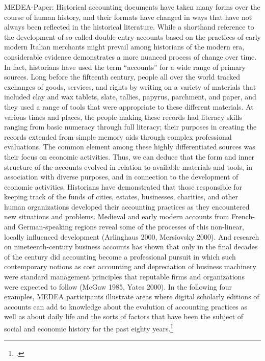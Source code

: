 \documentclass[12pt,a4paper]{article}
\begin{document}
MEDEA-Paper:
Historical accounting documents have taken many forms over the course of human history, and
their formats have changed in ways that have not always been reflected in the historical
literature. While a shorthand reference to the development of so-called double entry accounts
based on the practices of early modern Italian merchants might prevail among historians of the
modern era, considerable evidence demonstrates a more nuanced process of change over time. In
fact, historians have used the term “accounts” for a wide range of primary sources. Long before
the fifteenth century, people all over the world tracked exchanges of goods, services, and rights
by writing on a variety of materials that included clay and wax tablets, slate, tallies, papyrus,
parchment, and paper, and they used a range of tools that were appropriate to these different
materials. At various times and places, the people making these records had literacy skills
ranging from basic numeracy through full literacy; their purposes in creating the records
extended from simple memory aids through complex professional evaluations. The common
element among these highly differentiated sources was their focus on economic activities. Thus,
we can deduce that the form and inner structure of the accounts evolved in relation to available
materials and tools, in association with diverse purposes, and in connection to the development
of economic activities.
Historians have demonstrated that those responsible for keeping track of the funds of cities,
estates, businesses, charities, and other human organizations developed their accounting
practices as they encountered new situations and problems. Medieval and early modern accounts
from French- and German-speaking regions reveal some of the processes of this non-linear,
locally influenced development (Arlinghaus 2000, Mersiovsky 2000). And research on
nineteenth-century business accounts has shown that only in the final decades of the century did
accounting become a professional pursuit in which such contemporary notions as cost accounting
and depreciation of business machinery were standard management principles that reputable
firms and organizations were expected to follow (McGaw 1985, Yates 2000). In the following
four examples, MEDEA participants illustrate areas where digital scholarly editions of accounts
can add to knowledge about the evolution of accounting practices as well as about daily life and
the sorts of factors that have been the subject of social and economic history for the past eighty
years.\footcite[][S.2]{tomasekmedea}
\\
\end{document}
